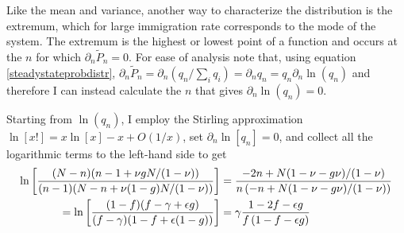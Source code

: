 Like the mean and variance, another way to characterize the distribution is the extremum, which for large immigration rate corresponds to the mode of the system. 
The extremum is the highest or lowest point of a function and occurs at the $n$ for which $\partial_n \widetilde{P}_n = 0$. 
For ease of analysis note that, using equation \ref{steadystateprobdistr}, $\partial_n \widetilde{P}_n = \partial_n \left( q_n/\sum_i q_i \right) = \partial_n q_n = q_n \partial_n \ln(q_n)$ and therefore I can instead calculate the $n$ that gives $\partial_n \ln(q_n)=0$. 
\iffalse
First,
\begin{align}
 \ln(q_n) &= 2\ln[N] - \ln\big[n(N-n)(1-\nu)+(1-g)n N\nu\big] + \ln[(N-n)!] + \ln\big[\left(n-1+\frac{\nu g N}{1-\nu}\right)!\big] \\
 		  &\, + \ln\big[\left(N-n+\frac{\nu (1-g) N}{1-\nu}\right)!\big] - \ln[(N-n)!] - \ln[(n-1)!] - \ln\big[\left(\frac{\nu g N}{1-\nu}\right)!\big] - \ln\big[\left(N-1+\frac{\nu (1-g) N}{1-\nu}\right)!\big] . \notag%
\end{align}
\fi
Starting from $\ln(q_n)$, I employ the Stirling approximation $\ln[x!] = x\ln[x] - x + O(1/x)$, set $\partial_n \ln[q_n]=0$, and collect all the logarithmic terms to the left-hand side to get
\iffalse
\begin{align}
 \ln\left[ \frac{(N-n)(n-1+\nu g N/(1-\nu))}{(n-1)(N-n+\nu(1-g)N/(1-\nu))}\right]  &= \frac{-2n+N(1-\nu-g\nu)/(1-\nu)}{n\left(-n+N(1-\nu-g\nu)/(1-\nu)\right)} \notag \\
=\ln\left[ \frac{(1-f)(f-\gamma+\epsilon g)}{(f-\gamma)(1-f+\epsilon(1-g))}\right] &= \gamma\frac{1-2f-\epsilon g}{f\left(1-f-\epsilon g\right)}
\end{align}

